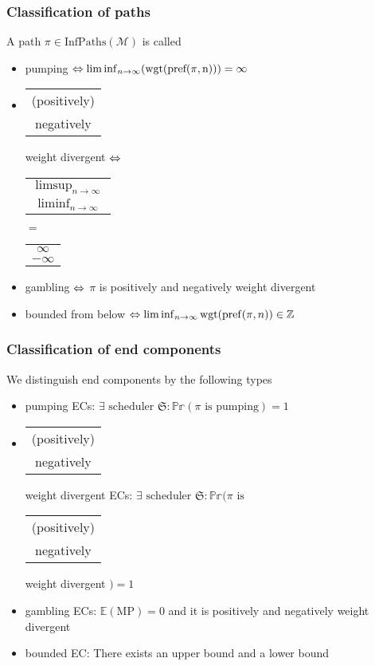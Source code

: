 \documentclass[onlymath]{beamer}
\begin{document}
\begin{frame}
	\frametitle{Classification of paths}
	A path $\pi \in \mathrm{InfPaths}(\mathcal{M})$ is called 
	\begin{itemize}
		\item pumping $\ratio\Leftrightarrow \liminf_{n \to \infty}(\mathrm{wgt}(\mathrm{pref(\pi, n)})) = \infty$
		\item \begin{tabular}{c}(positively) \\ negatively \end{tabular} weight divergent $\ratio\Leftrightarrow$ \begin{tabular}{c} $\limsup_{n \to \infty}$ \\ $\liminf_{n \to \infty}$ \end{tabular} $=$ \begin{tabular}{c} ${\infty}$ \\ ${-\infty}$ \end{tabular}
		\item gambling $\ratio\Leftrightarrow$ $\pi$ is positively and negatively weight divergent
		\item bounded from below $\ratio\Leftrightarrow \liminf_{n \to \infty} \mathrm{wgt}(\mathrm{pref}(\pi,n)) \in \mathbb{Z}$
	\end{itemize}
\end{frame}

\begin{frame}
\frametitle{Classification of end components}
We distinguish end components by the following types
\begin{itemize}
	\item pumping ECs: $\exists \text{ scheduler } \mathfrak{S}: \mathbb{Pr}(\pi \text{ is pumping}) = 1$
	\item \begin{tabular}{c}(positively) \\ negatively \end{tabular} weight divergent ECs: $\exists \text{ scheduler } \mathfrak{S}: \mathbb{Pr}(\pi \text{ is }$ \begin{tabular}{c}(positively) \\ negatively \end{tabular} weight divergent $) = 1$
	\item gambling ECs: $\mathbb{E}(\mathrm{MP}) = 0$ and it is positively and negatively weight divergent
	\item bounded EC: There exists an upper bound and a lower bound
\end{itemize}
\end{frame}
\end{document}
